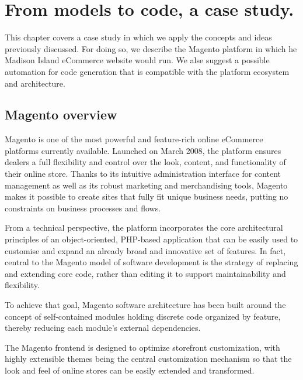 \chead{}

\chapter{From models to code, a case study.}

This chapter covers a case study in which we apply the concepts and ideas previously discussed. For doing so, we describe the Magento platform in which he Madison Island eCommerce website would run. We alse suggest a possible automation for code generation that is compatible with the platform ecosystem and architecture.

\section{Magento overview}

Magento is one of the most powerful and feature-rich online eCommerce platforms currently available. Launched on March 2008, the platform ensures dealers a full flexibility and control over the look, content, and functionality of their online store. Thanks to its intuitive administration interface for content management as well as its robust marketing and merchandising tools, Magento makes it possible to create sites that fully fit unique business needs, putting no constraints on business processes and flows.

From a technical perspective, the platform incorporates the core architectural principles of an object-oriented, PHP-based application that can be easily used to customise and expand an already broad and innovative set of features. In fact, central to the Magento model of software development is the strategy of replacing and extending core code, rather than editing it to support maintainability and flexibility. 

To achieve that goal, Magento software architecture has been built around the concept of self-contained modules holding discrete code organized by feature, thereby reducing each module’s external dependencies.

The Magento frontend is designed to optimize storefront customization, with highly extensible themes being the central customization mechanism so that the look and feel of online stores can be easily extended and transformed.

